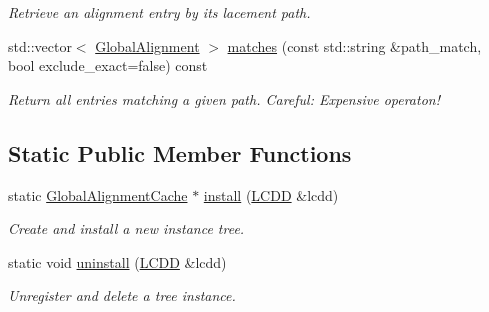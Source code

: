 \begin{DoxyCompactItemize}
\begin{DoxyCompactList}\small\item\em Retrieve an alignment entry by its lacement path. \end{DoxyCompactList}\item 
std\+::vector$<$ \hyperlink{class_d_d4hep_1_1_alignments_1_1_global_alignment}{Global\+Alignment} $>$ \hyperlink{class_d_d4hep_1_1_alignments_1_1_global_alignment_cache_a13fc5a6b92fb8b9111c075a511850dcd}{matches} (const std\+::string \&path\+\_\+match, bool exclude\+\_\+exact=false) const
\begin{DoxyCompactList}\small\item\em Return all entries matching a given path. Careful\+: Expensive operaton! \end{DoxyCompactList}\end{DoxyCompactItemize}
\subsection*{Static Public Member Functions}
\begin{DoxyCompactItemize}
\item 
static \hyperlink{class_d_d4hep_1_1_alignments_1_1_global_alignment_cache}{Global\+Alignment\+Cache} $\ast$ \hyperlink{class_d_d4hep_1_1_alignments_1_1_global_alignment_cache_a3ab52f93597d2c6facf29a0ecea5c7a2}{install} (\hyperlink{class_d_d4hep_1_1_geometry_1_1_l_c_d_d}{L\+C\+DD} \&lcdd)
\begin{DoxyCompactList}\small\item\em Create and install a new instance tree. \end{DoxyCompactList}\item 
static void \hyperlink{class_d_d4hep_1_1_alignments_1_1_global_alignment_cache_a8522b477a1db233bc330cc3c546dd9e7}{uninstall} (\hyperlink{class_d_d4hep_1_1_geometry_1_1_l_c_d_d}{L\+C\+DD} \&lcdd)
\begin{DoxyCompactList}\small\item\em Unregister and delete a tree instance. \end{DoxyCompactList}\end{DoxyCompactItemize}
